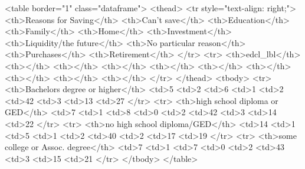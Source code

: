 <table border="1" class="dataframe">
  <thead>
    <tr style="text-align: right;">
      <th>Reasons for Saving</th>
      <th>Can't save</th>
      <th>Education</th>
      <th>Family</th>
      <th>Home</th>
      <th>Investment</th>
      <th>Liquidity/the future</th>
      <th>No particular reason</th>
      <th>Purchases</th>
      <th>Retirement</th>
    </tr>
    <tr>
      <th>edcl_lbl</th>
      <th></th>
      <th></th>
      <th></th>
      <th></th>
      <th></th>
      <th></th>
      <th></th>
      <th></th>
      <th></th>
    </tr>
  </thead>
  <tbody>
    <tr>
      <th>Bachelors degree or higher</th>
      <td>5%
      <td>2%
      <td>6%
      <td>1%
      <td>2%
      <td>42%
      <td>3%
      <td>13%
      <td>27%
    </tr>
    <tr>
      <th>high school diploma or GED</th>
      <td>7%
      <td>1%
      <td>8%
      <td>0%
      <td>2%
      <td>42%
      <td>3%
      <td>14%
      <td>22%
    </tr>
    <tr>
      <th>no high school diploma/GED</th>
      <td>14%
      <td>1%
      <td>5%
      <td>1%
      <td>2%
      <td>40%
      <td>2%
      <td>17%
      <td>19%
    </tr>
    <tr>
      <th>some college or Assoc. degree</th>
      <td>7%
      <td>1%
      <td>7%
      <td>0%
      <td>2%
      <td>43%
      <td>3%
      <td>15%
      <td>21%
    </tr>
  </tbody>
</table>
